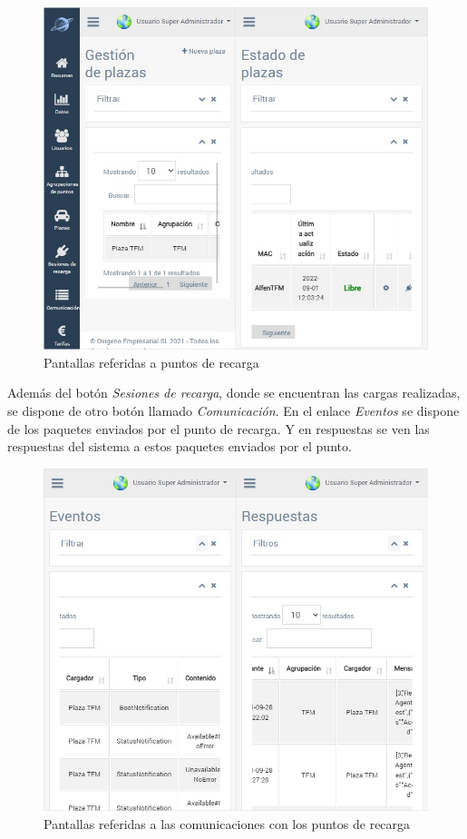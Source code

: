 \documentclass[12pt,a4paper,onecolumn,oneside]{report}
\begin{document}
\begin{figure}[H] 
\centering
  \includegraphics[width=1\textwidth]{figuras/design4.png}
  \caption[Pantallas referidas a puntos de recarga]{Pantallas referidas a puntos de recarga\\
  }
  \label{fig:design4}
\end{figure}

Además del botón \textit{Sesiones de recarga}, donde se encuentran las cargas realizadas, se dispone de otro botón llamado \textit{Comunicación}. En el enlace \textit{Eventos} se dispone de los paquetes enviados por el punto de recarga. Y en respuestas se ven las respuestas del sistema a estos paquetes enviados por el punto.

\begin{figure}[H] 
\centering
  \includegraphics[width=1\textwidth]{figuras/design5.png}
  \caption[Pantallas referidas a las comunicaciones con los puntos de recarga]{Pantallas referidas a las comunicaciones con los puntos de recarga\\
  }
  \label{fig:design5}
\end{figure}
\end{document}
